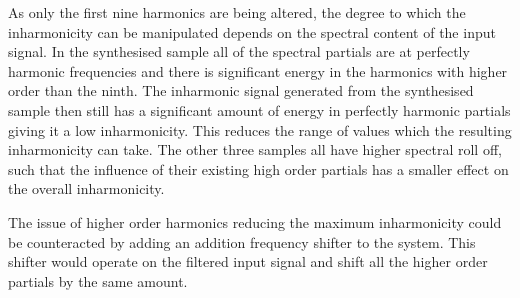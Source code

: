 		As only the first nine harmonics are being altered, the degree to which the inharmonicity can be
		manipulated depends on the spectral content of the input signal. In the synthesised sample all of the
		spectral partials are at perfectly harmonic frequencies and there is significant energy in the harmonics
		with higher order than the ninth. The inharmonic signal generated from the synthesised sample then still
		has a significant amount of energy in perfectly harmonic partials giving it a low inharmonicity. This
		reduces the range of values which the resulting inharmonicity can take. The other three samples all have
		higher spectral roll off, such that the influence of their existing high order partials has a smaller
		effect on the overall inharmonicity.

		The issue of higher order harmonics reducing the maximum inharmonicity could be counteracted by adding an
		addition frequency shifter to the system. This shifter would operate on the filtered input signal and shift
		all the higher order partials by the same amount.

